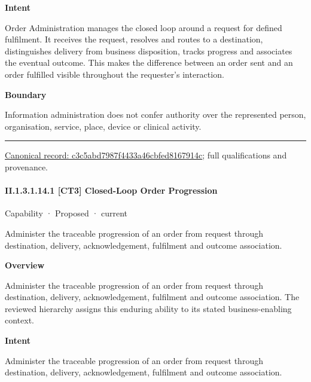 \textbf{Intent}



Order Administration manages the closed loop around a request for defined fulfilment. It receives the request, resolves and routes to a destination, distinguishes delivery from business disposition, tracks progress and associates the eventual outcome. This makes the difference between an order sent and an order fulfilled visible throughout the requester's interaction.



\textbf{Boundary}



Information administration does not confer authority over the represented person, organisation, service, place, device or clinical activity.



\medskip\hrule\medskip

{\footnotesize \href{../../../../continuum/strategy/capability/c3c5abd7987f4433a46cbfed8167914c.md}{Canonical record: c3c5abd7987f4433a46cbfed8167914c}; full qualifications and provenance.}\par
\paragraph*{II.1.3.1.14.1 [CT3] Closed-Loop Order Progression}
\label{navigation:II.1.3.1.14.1}

\label{element:2f79ebd7392c46ef92def6f25bc9c7ce}
{\small Capability · Proposed · current}\par

Administer the traceable progression of an order from request through destination, delivery, acknowledgement, fulfilment and outcome association.



\textbf{Overview}



Administer the traceable progression of an order from request through destination, delivery, acknowledgement, fulfilment and outcome association. The reviewed hierarchy assigns this enduring ability to its stated business-enabling context.



\textbf{Intent}



Administer the traceable progression of an order from request through destination, delivery, acknowledgement, fulfilment and outcome association.



